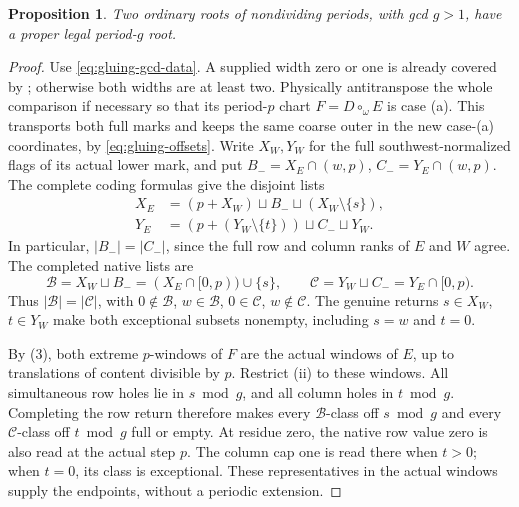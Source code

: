 \documentclass[11pt,a4paper]{amsart}
\numberwithin{equation}{section}
\theoremstyle{plain}
\newtheorem{proposition}[theorem]{Proposition}
\theoremstyle{definition}
\begin{document}
\begin{proposition}\label{prop:gluing-ordinary-fold}
Two ordinary roots of nondividing periods, with gcd \(g>1\), have a proper legal period-\(g\) root.
\end{proposition}
\begin{proof}
Use \eqref{eq:gluing-gcd-data}.  A supplied width zero or one is
already covered by ; otherwise both widths
are at least two.  Physically antitranspose the whole comparison
if necessary so that its period-\(p\) chart \(F=D\circ_\omega E\)
is case (a).  This transports both full marks and keeps the same
coarse outer in the new case-(a) coordinates, by
\eqref{eq:gluing-offsets}.  Write \(X_W,Y_W\) for the full
southwest-normalized flags of its actual lower mark, and put
\(B_-=X_E\cap(w,p)\), \(C_-=Y_E\cap(w,p)\).
The complete coding formulas give the disjoint lists
\[
 \begin{aligned}
 X_E&=(p+X_W)\sqcup B_-\sqcup(X_W\setminus\{s\}),\\
 Y_E&=(p+(Y_W\setminus\{t\}))\sqcup C_-\sqcup Y_W.
 \end{aligned}
\]
In particular, \(|B_-|=|C_-|\), since the full row and column
ranks of \(E\) and \(W\) agree.  The completed native lists are
\[
 \mathcal B=X_W\sqcup B_-=(X_E\cap[0,p))\cup\{s\},
 \qquad
 \mathcal C=Y_W\sqcup C_-=Y_E\cap[0,p).
\]
Thus \(|\mathcal B|=|\mathcal C|\), with
\(0\notin\mathcal B\), \(w\in\mathcal B\),
\(0\in\mathcal C\), \(w\notin\mathcal C\).
The genuine returns \(s\in X_W\), \(t\in Y_W\) make both
exceptional subsets nonempty, including \(s=w\) and \(t=0\).

By (3), both extreme \(p\)-windows of
\(F\) are the actual windows of \(E\), up to translations of
content divisible by \(p\).  Restrict (ii)
to these windows.  All simultaneous row holes lie in \(s\bmod g\),
and all column holes in \(t\bmod g\).  Completing the row return
therefore makes every \(\mathcal B\)-class off \(s\bmod g\) and
every \(\mathcal C\)-class off \(t\bmod g\) full or empty.
At residue zero, the native row value zero is also read at the
actual step \(p\).  The column cap one is read there when \(t>0\);
when \(t=0\), its class is exceptional.  These representatives in
the actual windows supply the endpoints, without a periodic extension.


\end{proof}
\end{document}
